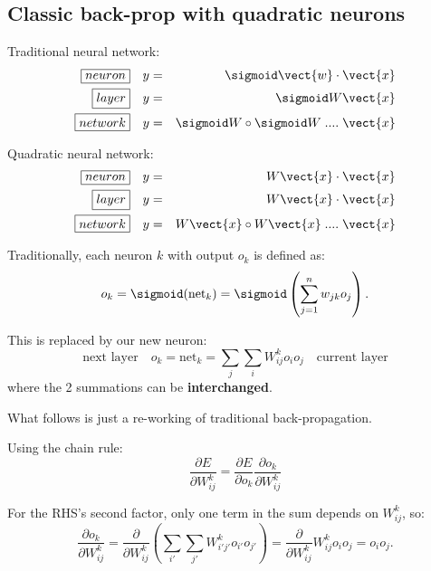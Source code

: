\subsection{Classic back-prop with quadratic neurons}

Traditional neural network:
\begin{eqnarray}
\boxed{neuron} \quad & y = & \sigmoid \vect{w} \cdot \vect{x} \nonumber \\
\boxed{layer} \quad & y = & \sigmoid W \vect{x} \nonumber \\
\boxed{network} \quad & y = & \sigmoid W \circ \sigmoid W \; .... \; \vect{x} 
\end{eqnarray}

Quadratic neural network:
\begin{eqnarray}
\boxed{neuron} \quad & y = & W \vect{x} \cdot \vect{x} \nonumber \\
\boxed{layer} \quad & y = & W \vect{x} \cdot \vect{x} \nonumber \\
\boxed{network} \quad & y = & W \vect{x} \circ W \vect{x} \; .... \; \vect{x} 
\end{eqnarray}

Traditionally, each neuron $k$ with output $o_k$ is defined as:
\begin{equation}
o_k = \sigmoid ({\text{net}}_k) = \sigmoid \left(\sum _{j=1}^{n} w_{jk} o_j \right) .
\end{equation}

This is replaced by our new neuron:
\begin{equation}
\boxed{\mbox{next layer}} \quad
o_k = {\text{net}}_k = \sum_j \sum_i W_{ij}^k o_i o_j
\quad \boxed{\mbox{current layer}}
\end{equation}
where the 2 summations can be \textbf{interchanged}.

What follows is just a re-working of traditional back-propagation.

Using the chain rule:
\begin{equation}
\frac{\partial E}{\partial W_{ij}^k}
= \frac{\partial E}{\partial o_k} \frac{\partial o_k}{\partial W_{ij}^k}
\end{equation}

For the RHS's second factor, only one term in the sum depends on $W_{ij}^k$, so:
\begin{equation}
	\label{eqn:do-k-dW}
\frac{\partial o_k}{\partial W_{ij}^k}
= \frac{\partial }{\partial W_{ij}^k} \left( \sum_{i'} \sum_{j'} W_{i' j'}^k o_{i'} o_{j'} \right)
= \frac{\partial }{\partial W_{ij}^k} W_{ij}^k o_i o_j = o_i o_j .
\end{equation}


